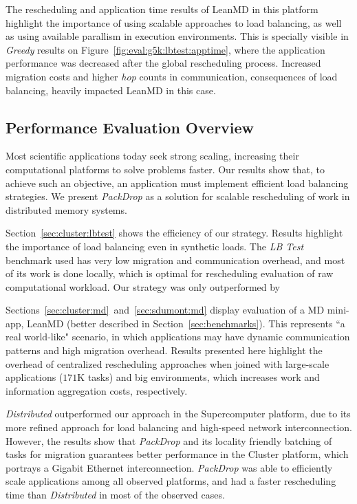 The rescheduling and application time results of LeanMD in this platform highlight the importance of using scalable approaches to load balancing, as well as using available parallism in execution environments.
This is specially visible in \textit{Greedy} results on Figure~\ref{fig:eval:g5k:lbtest:apptime}, where the application performance was decreased after the global rescheduling process.
Increased migration costs and higher \textit{hop} counts in communication, consequences of load balancing, heavily impacted LeanMD in this case.

\subsection{Performance Evaluation Overview} \label{eval:overview}

Most scientific applications today seek strong scaling, increasing their computational platforms to solve problems faster.
Our results show that, to achieve such an objective, an application must implement efficient load balancing strategies.
We present \textit{PackDrop} as a solution for scalable rescheduling of work in distributed memory systems.

Section~\ref{sec:cluster:lbtest} shows the efficiency of our strategy. 
Results highlight the importance of load balancing even in synthetic loads.
The \textit{LB Test} benchmark used has very low migration and communication overhead, and most of its work is done locally, which is optimal for rescheduling evaluation of raw computational workload.
Our strategy was only outperformed by 

Sections~\ref{sec:cluster:md}~and~\ref{sec:sdumont:md} display evaluation of a MD mini-app, LeanMD (better described in Section~\ref{sec:benchmarks}).
This represents ``a real world-like" scenario, in which applications may have dynamic communication patterns and high migration overhead.
Results presented here highlight the overhead of centralized rescheduling approaches when joined with large-scale applications ($171$K tasks) and big environments, which increases work and information aggregation costs, respectively.

\textit{Distributed} outperformed our approach in the Supercomputer platform, due to its more refined approach for load balancing and high-speed network interconnection.
However, the results show that \textit{PackDrop} and its locality friendly batching of tasks for migration guarantees better performance in the Cluster platform, which portrays a Gigabit Ethernet interconnection.
\textit{PackDrop} was able to efficiently scale applications among all observed platforms, and had a faster rescheduling time than \textit{Distributed} in most of the observed cases.
